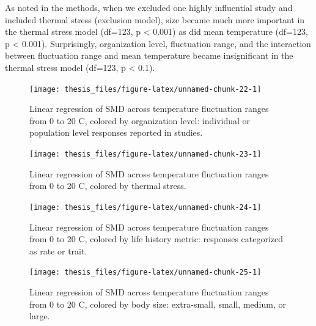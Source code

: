 \documentclass[12pt,twoside]{reedthesis}
\begin{document}
As noted in the methods, when we excluded one highly influential study and included thermal stress (exclusion model), size became much more important in the thermal stress model (df=123, p \textless{} 0.001) as did mean temperature (df=123, p \textless{} 0.001). Surprisingly, organization level, fluctuation range, and the interaction between fluctuation range and mean temperature became insignificant in the thermal stress model (df=123, p \textless{} 0.1).
\begin{figure}

{\centering \texttt{[image: thesis\_files/figure-latex/unnamed-chunk-22-1]} 

}

\caption[Effect sizes across temperature range by organization level]{Linear regression of SMD across temperature fluctuation ranges from 0 to 20 C, colored by organization level: individual or population level responses reported in studies.}\label{fig:unnamed-chunk-22}
\end{figure}
\begin{figure}

{\centering \texttt{[image: thesis\_files/figure-latex/unnamed-chunk-23-1]} 

}

\caption[Effect sizes across temperature range by thermal stress]{Linear regression of SMD across temperature fluctuation ranges from 0 to 20 C, colored by thermal stress.}\label{fig:unnamed-chunk-23}
\end{figure}
\begin{figure}

{\centering \texttt{[image: thesis\_files/figure-latex/unnamed-chunk-24-1]} 

}

\caption[Effect sizes across temperature range by response type]{Linear regression of SMD across temperature fluctuation ranges from 0 to 20 C, colored by life history metric: responses categorized as rate or trait.}\label{fig:unnamed-chunk-24}
\end{figure}
\begin{figure}

{\centering \texttt{[image: thesis\_files/figure-latex/unnamed-chunk-25-1]} 

}

\caption[Effect sizes across temperature range by body size]{Linear regression of SMD across temperature fluctuation ranges from 0 to 20 C, colored by body size: extra-small, small, medium, or large.}\label{fig:unnamed-chunk-25}
\end{figure}
\end{document}
